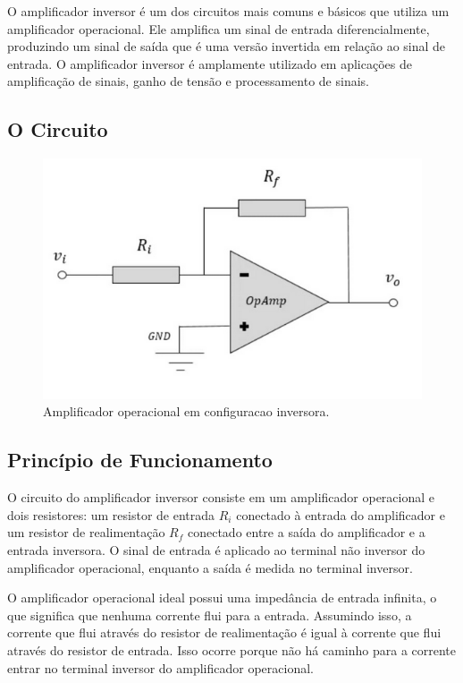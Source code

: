 \documentclass[12pt,twoside, a4paper, twocolumn]{article}
\begin{document}
O amplificador inversor é um dos circuitos mais comuns e básicos que utiliza um amplificador operacional. Ele amplifica um sinal de entrada diferencialmente, produzindo um sinal de saída que é uma versão invertida em relação ao sinal de entrada. O amplificador inversor é amplamente utilizado em aplicações de amplificação de sinais, ganho de tensão e processamento de sinais.


\subsection{O Circuito}


\begin{figure}[h]
    \centering
    \includegraphics[width=1\columnwidth]{images/opamp_inversor.png}
    \caption{Amplificador operacional em configuracao inversora.}
\end{figure}


\subsection{Princípio de Funcionamento}



O circuito do amplificador inversor consiste em um amplificador operacional e dois resistores: um resistor de entrada $R_i$ conectado à entrada do amplificador e um resistor de realimentação $R_f$ conectado entre a saída do amplificador e a entrada inversora. O sinal de entrada é aplicado ao terminal não inversor do amplificador operacional, enquanto a saída é medida no terminal inversor.

O amplificador operacional ideal possui uma impedância de entrada infinita, o que significa que nenhuma corrente flui para a entrada. Assumindo isso, a corrente que flui através do resistor de realimentação é igual à corrente que flui através do resistor de entrada. Isso ocorre porque não há caminho para a corrente entrar no terminal inversor do amplificador operacional.
\end{document}
